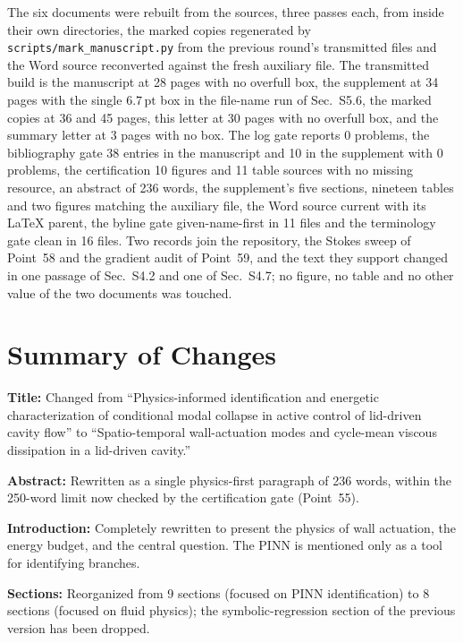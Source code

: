 \documentclass[11pt,a4paper]{article}
\newcommand{\brk}{\hspace{0pt}}
\begin{document}
The six documents were rebuilt from the sources, three passes each, from inside
their own directories, the marked copies regenerated by
\texttt{scripts/mark\_manuscript\brk.py} from the previous round's transmitted
files and the Word source reconverted against the fresh auxiliary file. The
transmitted build is the manuscript at 28 pages with no overfull box, the
supplement at 34 pages with the single \(6.7\,\mathrm{pt}\) box in the file-name
run of Sec.~S5.6, the marked copies at 36 and 45 pages, this letter at 30 pages
with no overfull box, and
the summary letter at 3 pages with no box. The log gate reports 0 problems, the
bibliography gate 38 entries in the manuscript and 10 in the supplement with 0
problems, the certification 10 figures and 11 table sources with no missing
resource, an abstract of 236 words, the supplement's five sections, nineteen
tables and two figures matching the auxiliary file, the Word source current with
its \LaTeX{} parent, the byline gate given-name-first in 11 files and the
terminology gate clean in 16 files. Two records join the repository, the Stokes
sweep of Point~58 and the gradient audit of Point~59, and the text they support
changed in one passage of Sec.~S4.2 and one of Sec.~S4.7; no figure, no table and
no other value of the two documents was touched.

\newpage

\section*{Summary of Changes}

\noindent\textbf{Title:} Changed from ``Physics-informed identification and
energetic characterization of conditional modal collapse in active control of
lid-driven cavity flow'' to ``Spatio-temporal wall-actuation modes and
cycle-mean viscous dissipation in a lid-driven cavity.''

\noindent\textbf{Abstract:} Rewritten as a single physics-first paragraph of
236 words, within the 250-word limit now checked by the certification gate
(Point~55).

\noindent\textbf{Introduction:} Completely rewritten to present the physics of
wall actuation, the energy budget, and the central question. The PINN is
mentioned only as a tool for identifying branches.

\noindent\textbf{Sections:} Reorganized from 9 sections (focused on PINN
identification) to 8 sections (focused on fluid physics); the symbolic-regression
section of the previous version has been dropped.
\end{document}
